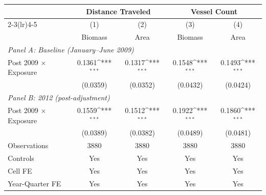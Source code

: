 \def\sym#1{\ifmmode^{#1}\else\(^{#1}\)\fi}
\begin{tabular}{l*{4}{c}}
\hline\hline
                    &\multicolumn{2}{c}{Distance Traveled}&\multicolumn{2}{c}{Vessel Count}\\
                    \cmidrule(lr){2-3}\cmidrule(lr){4-5}
                    &\multicolumn{1}{c}{(1)}&\multicolumn{1}{c}{(2)}&\multicolumn{1}{c}{(3)}&\multicolumn{1}{c}{(4)}\\
                    &\multicolumn{1}{c}{Biomass}&\multicolumn{1}{c}{Area}&\multicolumn{1}{c}{Biomass}&\multicolumn{1}{c}{Area}\\
\hline
\multicolumn{5}{l}{\textit{Panel A: Baseline (January--June 2009)}}\\[0.3em]
Post 2009 $\times$ Exposure&     0.1361\sym{***}&     0.1317\sym{***}&     0.1548\sym{***}&     0.1493\sym{***}\\
                    &             (0.0359)&             (0.0352)&             (0.0432)&             (0.0424)\\
[0.8em]
\multicolumn{5}{l}{\textit{Panel B: 2012 (post-adjustment)}}\\[0.3em]
Post 2009 $\times$ Exposure&     0.1559\sym{***}&     0.1512\sym{***}&     0.1922\sym{***}&     0.1860\sym{***}\\
                    &             (0.0389)&             (0.0382)&             (0.0489)&             (0.0481)\\
[0.5em]
\hline
Observations        &        3880         &        3880         &        3880         &        3880         \\
Controls            &         Yes         &         Yes         &         Yes         &         Yes         \\
Cell FE             &         Yes         &         Yes         &         Yes         &         Yes         \\
Year-Quarter FE     &         Yes         &         Yes         &         Yes         &         Yes         \\
\hline\hline
\end{tabular}
